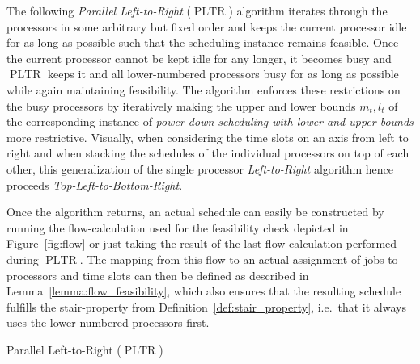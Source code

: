 \documentclass[a4paper]{article}
\DeclareMathOperator{\PLTR}{PLTR}
\DeclareMathOperator{\keepidle}{keepIdle}
\DeclareMathOperator{\keepbusy}{keepBusy}
\begin{document}
The following \emph{Parallel Left-to-Right} ($\PLTR$) algorithm iterates through the processors in some arbitrary but fixed order and keeps the current processor idle for as long as possible such that the scheduling instance remains feasible.
Once the current processor cannot be kept idle for any longer, it becomes busy and $\PLTR$ keeps it and all lower-numbered processors busy for as long as possible while again maintaining feasibility.
The algorithm enforces these restrictions on the busy processors by iteratively making the upper and lower bounds $m_t, l_t$ of the corresponding instance of \emph{power-down scheduling with lower and upper bounds} more restrictive.
Visually, when considering the time slots on an axis from left to right and when stacking the schedules of the individual processors on top of each other, this generalization of the single processor \emph{Left-to-Right} algorithm hence proceeds \emph{Top-Left-to-Bottom-Right}.

Once the algorithm returns, an actual schedule can easily be constructed by running the flow-calculation used for the feasibility check depicted in Figure~\ref{fig:flow} or just taking the result of the last flow-calculation performed during $\PLTR$.
The mapping from this flow to an actual assignment of jobs to processors and time slots can then be defined as described in Lemma~\ref{lemma:flow_feasibility}, which also ensures that the resulting schedule fulfills the stair-property from Definition~\ref{def:stair_property}, i.e.\ that it always uses the lower-numbered processors first.

\begin{algorithm}[H]
  \caption{Parallel Left-to-Right ($\PLTR$)}\label{alg:pltr}
\begin{algorithmic}
      \State{$t \gets $\Call{$\keepidle$}{$k, t$}}
      \State{$t \gets $\Call{$\keepbusy$}{$k, t$}}
    \EndWhile{}
  \EndFor{}
\end{algorithmic}
\end{algorithm}
\end{document}
